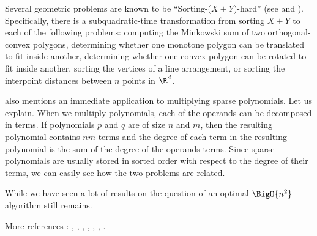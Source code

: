 Several geometric problems are known to be ``Sorting-($X + Y$)-hard'' (see
\cite{barrera1996finding} and \cite{barequet2001polygon}). Specifically, there
is a subquadratic-time transformation from sorting $X + Y$ to each of the
following problems: computing the Minkowski sum of two orthogonal-convex
polygons, determining whether one monotone polygon can be translated to fit
inside another, determining whether one convex polygon can be rotated to fit
inside another, sorting the vertices of a line arrangement, or sorting the
interpoint distances between $n$ points in $\R^d$.

\citet{fredman:1976} also mentions an immediate application to multiplying sparse
polynomials. Let us explain. When we multiply
polynomials, each of the operands can be decomposed in terms. If polynomials
$p$ and $q$ are of size $n$ and $m$, then the resulting polynomial contains
$nm$ terms and the degree of each term in the resulting polynomial is the sum
of the degree of the operands terms. Since sparse polynomials are usually
stored in sorted order with respect to the degree of their terms, we can easily
see how the two problems are related.

While we have seen a lot of results on  the question of an
optimal $\BigO{n^2}$ algorithm still remains.

More references : \cite{orourke:2012:sortxy}, \cite{kahnkim1},
\cite{dietzfelbinger1989lower}, \cite{steiger1995pseudo},
\cite{lambert1990sorting}, \cite{erickson:1999},
\cite{bremner2012necklaces}.



